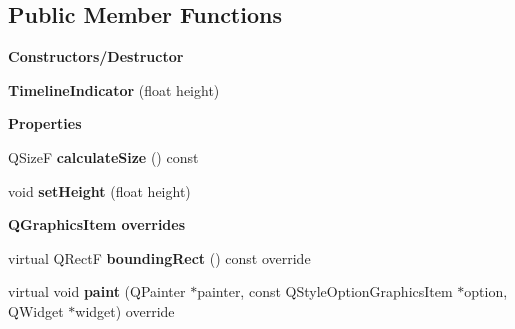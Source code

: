 \subsection*{Public Member Functions}
\begin{Indent}\textbf{ Constructors/\+Destructor}\par
\begin{DoxyCompactItemize}
\item 
\mbox{\label{classrev_1_1_view_1_1_timeline_indicator_a988c2eafce28ced3a10f5aa0d3c20f49}} 
{\bfseries Timeline\+Indicator} (float height)
\end{DoxyCompactItemize}
\end{Indent}
\begin{Indent}\textbf{ Properties}\par
\begin{DoxyCompactItemize}
\item 
\mbox{\label{classrev_1_1_view_1_1_timeline_indicator_ab4a3492b688ce181abf76d2865429c58}} 
Q\+SizeF {\bfseries calculate\+Size} () const
\item 
\mbox{\label{classrev_1_1_view_1_1_timeline_indicator_aca4926cef9546ca4fef3a895d5e0176f}} 
void {\bfseries set\+Height} (float height)
\end{DoxyCompactItemize}
\end{Indent}
\begin{Indent}\textbf{ Q\+Graphics\+Item overrides}\par
\begin{DoxyCompactItemize}
\item 
\mbox{\label{classrev_1_1_view_1_1_timeline_indicator_a2dacf2f0a7639602d4343831745796ab}} 
virtual Q\+RectF {\bfseries bounding\+Rect} () const override
\item 
\mbox{\label{classrev_1_1_view_1_1_timeline_indicator_aafabc949a622898486951a525a76ef44}} 
virtual void {\bfseries paint} (Q\+Painter $\ast$painter, const Q\+Style\+Option\+Graphics\+Item $\ast$option, Q\+Widget $\ast$widget) override
\end{DoxyCompactItemize}
\end{Indent}
